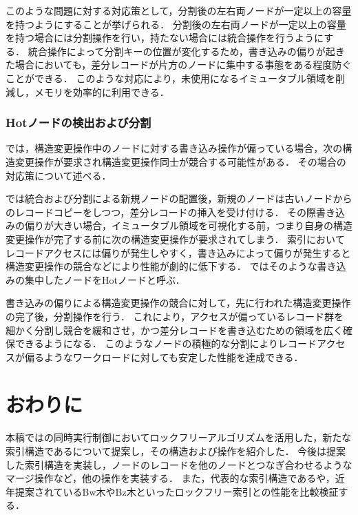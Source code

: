 このような問題に対する対応策として，分割後の左右両ノードが一定以上の容量を持つようにすることが挙げられる．
分割後の左右両ノードが一定以上の容量を持つ場合には分割操作を行い，持たない場合には統合操作を行うようにする．
統合操作によって分割キーの位置が変化するため，書き込みの偏りが起きた場合においても，差分レコードが片方のノードに集中する事態をある程度防ぐことができる．
このような対応により，未使用になるイミュータブル領域を削減し，メモリを効率的に利用できる．

\subsubsection{Hotノードの検出および分割}

\Bctree{}では，構造変更操作中のノードに対する書き込み操作が偏っている場合，次の構造変更操作が要求され構造変更操作同士が競合する可能性がある．
その場合の対応策について述べる．

\Bctree{}では統合および分割による新規ノードの配置後，新規のノードは古いノードからのレコードコピーをしつつ，差分レコードの挿入を受け付ける．
その際書き込みの偏りが大きい場合，イミュータブル領域を可視化する前，つまり自身の構造変更操作が完了する前に次の構造変更操作が要求されてしまう．
索引においてレコードアクセスには偏りが発生しやすく，書き込みによって偏りが発生すると構造変更操作の競合などにより性能が劇的に低下する．
\Bctree{}ではそのような書き込みの集中したノードをHotノードと呼ぶ．

書き込みの偏りによる構造変更操作の競合に対して，先に行われた構造変更操作の完了後，分割操作を行う．
これにより，アクセスが偏っているレコード群を細かく分割し競合を緩和させ，かつ差分レコードを書き込むための領域を広く確保できるようになる．
このようなノードの積極的な分割によりレコードアクセスが偏るようなワークロードに対しても安定した性能を達成できる．

\section{おわりに}
\label{sec:conclusion}

本稿では\Bptree{}の同時実行制御においてロックフリーアルゴリズムを活用した，新たな索引構造である\Bctree{}について提案し，その構造および操作を紹介した．
今後は提案した索引構造を実装し，ノードのレコードを他のノードとつなぎ合わせるようなマージ操作など，他の操作を実装する．
また，代表的な索引構造である\Bptree{}や，近年提案されているBw木やBz木といったロックフリー索引との性能を比較検証する．
